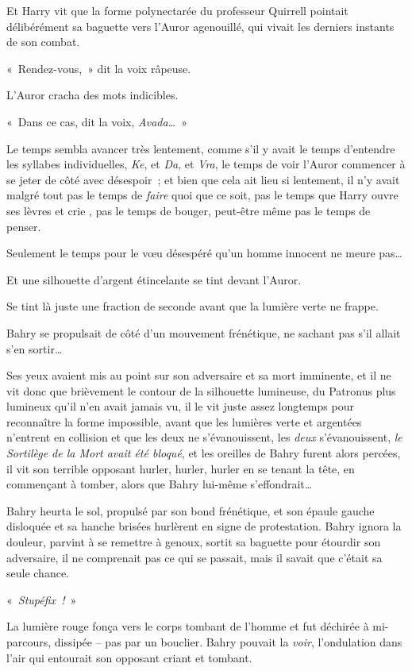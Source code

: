 Et Harry vit que la forme polynectarée du professeur Quirrell pointait délibérément sa baguette vers l'Auror agenouillé, qui vivait les derniers instants de son combat.

«~Rendez-vous,~» dit la voix râpeuse.

L'Auror cracha des mots indicibles.

«~Dans ce cas, dit la voix, \emph{Avada…}~»

Le temps sembla avancer très lentement, comme s'il y avait le temps d'entendre les syllabes individuelles, \emph{Ke}, et \emph{Da}, et \emph{Vra}, le temps de voir l'Auror commencer à se jeter de côté avec désespoir~; et bien que cela ait lieu si lentement, il n'y avait malgré tout pas le temps de \emph{faire} quoi que ce soit, pas le temps que Harry ouvre ses lèvres et crie , pas le temps de bouger, peut-être même pas le temps de penser.

Seulement le temps pour le vœu désespéré qu'un homme innocent ne meure pas…

Et une silhouette d'argent étincelante se tint devant l'Auror.

Se tint là juste une fraction de seconde avant que la lumière verte ne frappe.

\later

Bahry se propulsait de côté d'un mouvement frénétique, ne sachant pas s'il allait s'en sortir…

Ses yeux avaient mis au point sur son adversaire et sa mort imminente, et il ne vit donc que brièvement le contour de la silhouette lumineuse, du Patronus plus lumineux qu'il n'en avait jamais vu, il le vit juste assez longtemps pour reconnaître la forme impossible, avant que les lumières verte et argentées n'entrent en collision et que les deux ne s'évanouissent, les \emph{deux} s'évanouissent, \emph{le Sortilège de la Mort avait été bloqué}, et les oreilles de Bahry furent alors percées, il vit son terrible opposant hurler, hurler, hurler en se tenant la tête, en commençant à tomber, alors que Bahry lui-même s'effondrait…

Bahry heurta le sol, propulsé par son bond frénétique, et son épaule gauche disloquée et sa hanche brisées hurlèrent en signe de protestation.
Bahry ignora la douleur, parvint à se remettre à genoux, sortit sa baguette pour étourdir son adversaire, il ne comprenait pas ce qui se passait, mais il savait que c'était sa seule chance.

«~\emph{Stupéfix~!}~»

La lumière rouge fonça vers le corps tombant de l'homme et fut déchirée à mi-parcours, dissipée -- pas par un bouclier.
Bahry pouvait la \emph{voir}, l'ondulation dans l'air qui entourait son opposant criant et tombant.

